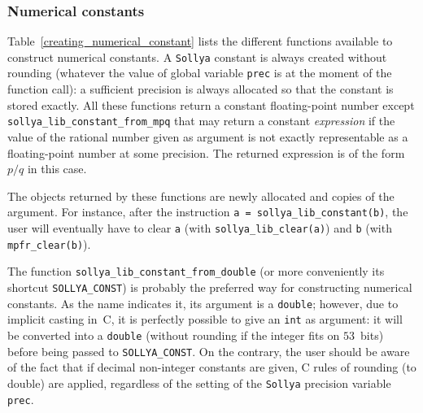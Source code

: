 \documentclass[a4paper]{article}
\newcommand{\sollya}{\texttt{Sollya}\xspace}
\begin{document}
\subsubsection{Numerical constants}
Table~\ref{creating_numerical_constant} lists the different functions available to construct numerical constants. A \sollya constant is always created without rounding (whatever the value of global variable \texttt{prec} is at the moment of the function call): a sufficient precision is always allocated so that the constant is stored exactly. All these functions return a constant floating-point number except \texttt{sollya\_lib\_constant\_from\_mpq} that may return a constant \emph{expression} if the value of the rational number given as argument is not exactly representable as a floating-point number at some precision. The returned expression is of the form $p/q$ in this case.

The objects returned by these functions are newly allocated and copies of the argument. For instance, after the instruction \texttt{a = sollya\_lib\_constant(b)}, the user will eventually have to clear \texttt{a} (with \texttt{sollya\_lib\_clear(a)}) and \texttt{b} (with \texttt{mpfr\_clear(b)}).

The function \texttt{sollya\_lib\_constant\_from\_double} (or more conveniently its shortcut \texttt{SOLLYA\_CONST}) is probably the preferred way for constructing numerical constants. As the name indicates it, its argument is a \texttt{double}; however, due to implicit casting in~C, it is perfectly possible to give an \texttt{int} as argument: it will be converted into a \texttt{double} (without rounding if the integer fits on $53$~bits) before being passed to \texttt{SOLLYA\_CONST}. On the contrary, the user should be aware of the fact that if decimal non-integer constants are given, C rules of rounding (to double) are applied, regardless of the setting of the \sollya precision variable \texttt{prec}.
\end{document}
